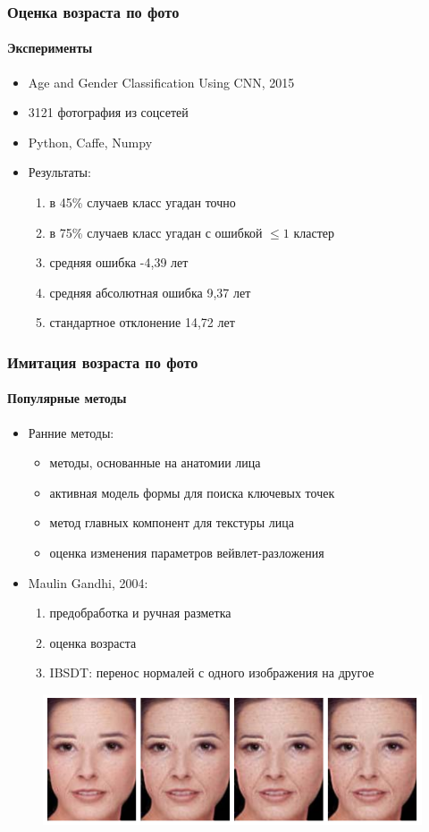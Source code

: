 \documentclass{beamer}
\begin{document}
  \begin{frame}
	  \frametitle{Оценка возраста по фото}
	  \framesubtitle{Эксперименты}
	  \begin{itemize}
	  	\item Age and Gender Classification Using CNN, 2015
	  	\item 3121 фотография из соцсетей
	  	\item Python, Caffe, Numpy
	  	\item Результаты:
	  	\begin{enumerate}
	  		\item в 45\% случаев класс угадан точно
	  		\item в 75\% случаев класс угадан с ошибкой $\leq1$  кластер
	  		\item средняя ошибка -4,39 лет
	  		\item средняя абсолютная ошибка 9,37 лет
	  		\item стандартное отклонение 14,72 лет
	  	\end{enumerate}
	  \end{itemize}
  \end{frame}   
  
  \begin{frame}
  	  \frametitle{Имитация возраста по фото}
  	  \framesubtitle{Популярные методы}
  	  \begin{itemize}
  	  	\item Ранние методы:
  	  	\begin{itemize}
  	  		\item методы, основанные на анатомии лица
  	  		\item активная модель формы для поиска ключевых точек
  	  		\item метод главных компонент для текстуры лица
  	  		\item оценка изменения параметров вейвлет-разложения
  	  	\end{itemize}

		\vspace{1em}	  	  	
  	  	
  	  	\item Maulin Gandhi, 2004:
		\begin{enumerate}
			\item предобработка и ручная разметка
			\item оценка возраста
			\item IBSDT: перенос нормалей с одного изображения на другое
		\end{enumerate}
  	  \end{itemize}
  	  \begin{figure}
  	  	\includegraphics[width=\textwidth]{gandhi_slide.png}
  	  \end{figure}
  \end{frame}
  
\end{document}
